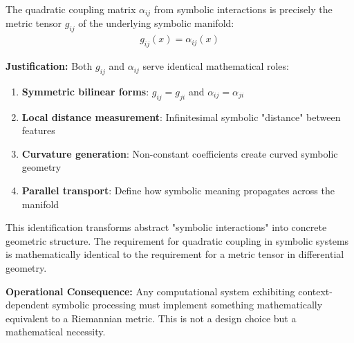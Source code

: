 \begin{proposition}
\label{proposition:bridge_to_geometry}
The quadratic coupling matrix $\alpha_{ij}$ from symbolic interactions is precisely the metric tensor $g_{ij}$ of the underlying symbolic manifold:
\begin{align}
g_{ij}(x) = \alpha_{ij}(x)
\end{align}

\textbf{Justification:} Both $g_{ij}$ and $\alpha_{ij}$ serve identical mathematical roles:
\begin{enumerate}
\item \textbf{Symmetric bilinear forms}: $g_{ij} = g_{ji}$ and $\alpha_{ij} = \alpha_{ji}$
\item \textbf{Local distance measurement}: Infinitesimal symbolic "distance" between features
\item \textbf{Curvature generation}: Non-constant coefficients create curved symbolic geometry
\item \textbf{Parallel transport}: Define how symbolic meaning propagates across the manifold
\end{enumerate}

This identification transforms abstract "symbolic interactions" into concrete geometric structure. The requirement for quadratic coupling in symbolic systems is mathematically identical to the requirement for a metric tensor in differential geometry.

\textbf{Operational Consequence:} Any computational system exhibiting context-dependent symbolic processing must implement something mathematically equivalent to a Riemannian metric. This is not a design choice but a mathematical necessity.
\end{proposition}

